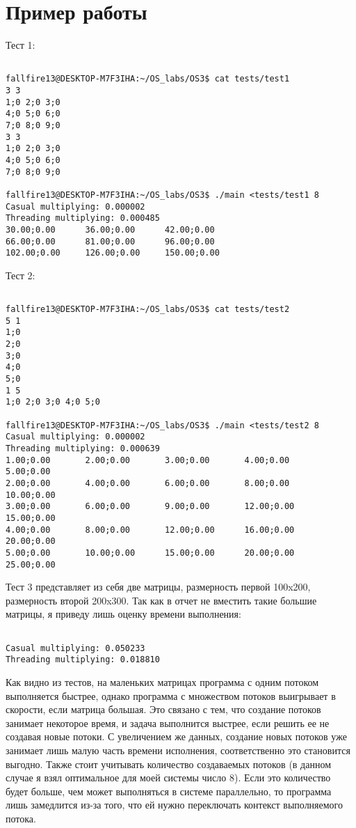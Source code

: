 \section{Пример работы}

Тест 1:

\begin{verbatim}

fallfire13@DESKTOP-M7F3IHA:~/OS_labs/OS3$ cat tests/test1
3 3
1;0 2;0 3;0
4;0 5;0 6;0
7;0 8;0 9;0
3 3
1;0 2;0 3;0
4;0 5;0 6;0
7;0 8;0 9;0

fallfire13@DESKTOP-M7F3IHA:~/OS_labs/OS3$ ./main <tests/test1 8
Casual multiplying: 0.000002
Threading multiplying: 0.000485
30.00;0.00      36.00;0.00      42.00;0.00
66.00;0.00      81.00;0.00      96.00;0.00
102.00;0.00     126.00;0.00     150.00;0.00

\end{verbatim}

Тест 2:

\begin{verbatim}

fallfire13@DESKTOP-M7F3IHA:~/OS_labs/OS3$ cat tests/test2
5 1
1;0
2;0
3;0
4;0
5;0
1 5
1;0 2;0 3;0 4;0 5;0

fallfire13@DESKTOP-M7F3IHA:~/OS_labs/OS3$ ./main <tests/test2 8
Casual multiplying: 0.000002
Threading multiplying: 0.000639
1.00;0.00       2.00;0.00       3.00;0.00       4.00;0.00       5.00;0.00
2.00;0.00       4.00;0.00       6.00;0.00       8.00;0.00       10.00;0.00
3.00;0.00       6.00;0.00       9.00;0.00       12.00;0.00      15.00;0.00
4.00;0.00       8.00;0.00       12.00;0.00      16.00;0.00      20.00;0.00
5.00;0.00       10.00;0.00      15.00;0.00      20.00;0.00      25.00;0.00

\end{verbatim}

Тест 3 представляет из себя две матрицы, размерность первой 100x200, размерность второй 200x300. Так как в отчет не вместить такие большие матрицы, я приведу лишь оценку времени выполнения:

\begin{verbatim}

Casual multiplying: 0.050233
Threading multiplying: 0.018810

\end{verbatim}

Как видно из тестов, на маленьких матрицах программа с одним потоком выполняется быстрее, однако программа с множеством потоков выигрывает в скорости, если матрица большая. Это связано с тем, что создание потоков занимает некоторое время, и задача выполнится выстрее, если решить ее не создавая новые потоки. С увеличением же данных, создание новых потоков уже занимает лишь малую часть времени исполнения, соответственно это становится выгодно. Также стоит учитывать количество создаваемых потоков (в данном случае я взял оптимальное для моей системы число 8). Если это количество будет больше, чем может выполняться в системе параллельно, то программа лишь замедлится из-за того, что ей нужно переключать контекст выполняемого потока.

\pagebreak


